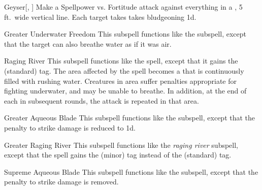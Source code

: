 \begin{ability}[\nth{3}]{Geyser}[, ]
Make a Spellpower vs. Fortitude attack against everything in a \arealarge, 5 ft.\ wide vertical line.
\hit Each target takes takes bludgeoning  \plus1d.
\end{ability}
\vspace{0.25em}


\begin{ability}[\nth{3}]{Greater Underwater Freedom}
This subspell functions like the  subspell, except that the target can also breathe water as if it was air.
\end{ability}
\vspace{0.25em}


\begin{ability}[\nth{4}]{Raging River}
This subspell functions like the  spell, except that it gains the  (standard) tag.
The area affected by the spell becomes a  that is continuously filled with rushing water.
Creatures in area suffer penalties appropriate for fighting underwater, and may be unable to breathe.
In addition, at the end of each  in subsequent rounds, the attack is repeated in that area.
\end{ability}
\vspace{0.25em}


\begin{ability}[\nth{6}]{Greater Aqueous Blade}
This subspell functions like the  subspell, except that the penalty to strike damage is reduced to \minus1d.
\end{ability}
\vspace{0.25em}


\begin{ability}[\nth{7}]{Greater Raging River}
This subspell functions like the \textit{raging river} subspell, except that the spell gains the  (minor) tag instead of the  (standard) tag.
\end{ability}
\vspace{0.25em}


\begin{ability}[\nth{9}]{Supreme Aqueous Blade}
This subspell functions like the  subspell, except that the penalty to strike damage is removed.
\end{ability}
\vspace{0.25em}

